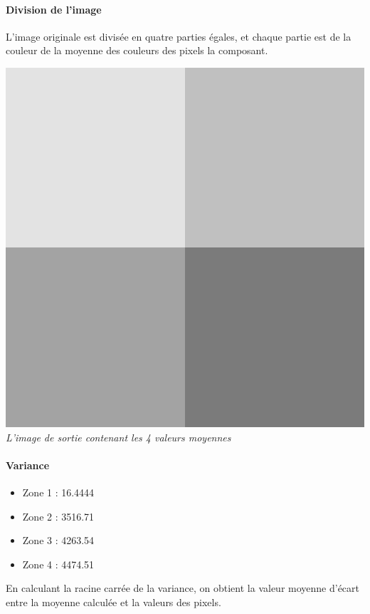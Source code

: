 \documentclass[a4paper,11pt]{article}
\begin{document}
\paragraph{Division de l'image} L'image originale est divisée en quatre parties égales, et chaque partie est de la couleur de la moyenne des couleurs des pixels la composant.
\begin{center}
\includegraphics[scale=0.6]{rolloDivMoy.png}\\
\textit{L'image de sortie contenant les 4 valeurs moyennes}
\end{center}

\paragraph{Variance}
\begin{itemize}
\item Zone 1 : 16.4444
\item Zone 2 : 3516.71
\item Zone 3 : 4263.54
\item Zone 4 : 4474.51
\end{itemize}
En calculant la racine carrée de la variance, on obtient la valeur moyenne d'écart entre la moyenne calculée et la valeurs des pixels.

\newpage
\end{document}
